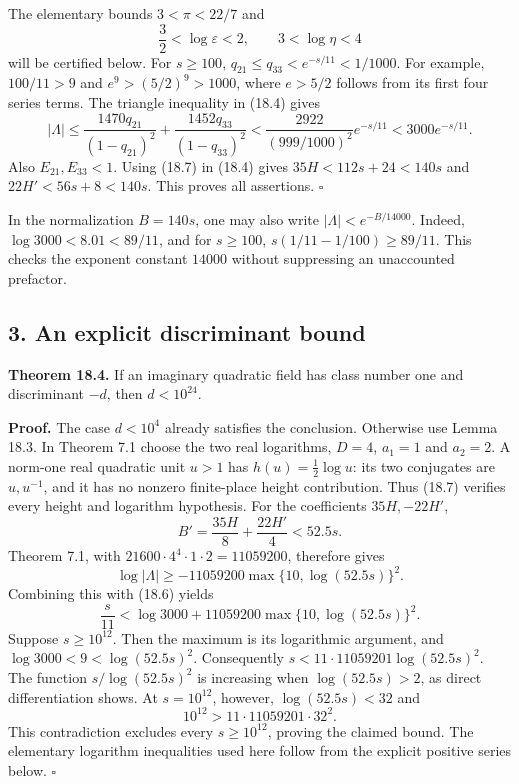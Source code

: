 \documentclass[
  11pt,
  a4paper,
]{article}
\begin{document}
The elementary bounds \(3<\pi<22/7\) and \[
 \frac32<\log\varepsilon<2,\qquad3<\log\eta<4
 \tag{18.7}
\] will be certified below. For \(s\ge100\),
\(q_{21}\le q_{33}<e^{-s/11}<1/1000\). For example, \(100/11>9\) and
\(e^9>(5/2)^9>1000\), where \(e>5/2\) follows from its first four series
terms. The triangle inequality in (18.4) gives \[
 |\Lambda|\le
 \frac{1470q_{21}}{(1-q_{21})^2}
 +\frac{1452q_{33}}{(1-q_{33})^2}
 <\frac{2922}{(999/1000)^2}e^{-s/11}
 <3000e^{-s/11}.
\] Also \(E_{21},E_{33}<1\). Using (18.7) in (18.4) gives
\(35H<112s+24<140s\) and \(22H'<56s+8<140s\). This proves all
assertions. \(\square\)

In the normalization \(B=140s\), one may also write
\(|\Lambda|<e^{-B/14000}\). Indeed, \(\log3000<8.01<89/11\), and for
\(s\ge100\), \(s(1/11-1/100)\ge89/11\). This checks the exponent
constant \(14000\) without suppressing an unaccounted prefactor.

\subsection{3. An explicit discriminant
bound}\label{an-explicit-discriminant-bound}

\textbf{Theorem 18.4.} If an imaginary quadratic field has class number
one and discriminant \(-d\), then \(d<10^{24}\).

\textbf{Proof.} The case \(d<10^4\) already satisfies the conclusion.
Otherwise use Lemma 18.3. In Theorem 7.1 choose the two real logarithms,
\(D=4\), \(a_1=1\) and \(a_2=2\). A norm-one real quadratic unit \(u>1\)
has \(h(u)=\tfrac12\log u\): its two conjugates are \(u,u^{-1}\), and it
has no nonzero finite-place height contribution. Thus (18.7) verifies
every height and logarithm hypothesis. For the coefficients
\(35H,-22H'\), \[
 B'=\frac{35H}{8}+\frac{22H'}4<52.5s.
 \tag{18.8}
\] Theorem 7.1, with \(21600\cdot4^4\cdot1\cdot2=11059200\), therefore
gives \[
 \log|\Lambda|\ge
 -11059200\max\{10,\log(52.5s)\}^2.
 \tag{18.9}
\] Combining this with (18.6) yields \[
 \frac{s}{11}<\log3000+
 11059200\max\{10,\log(52.5s)\}^2.
 \tag{18.10}
\] Suppose \(s\ge10^{12}\). Then the maximum is its logarithmic
argument, and \(\log3000<9<\log(52.5s)^2\). Consequently
\(s<11\cdot11059201\log(52.5s)^2\). The function \(s/\log(52.5s)^2\) is
increasing when \(\log(52.5s)>2\), as direct differentiation shows. At
\(s=10^{12}\), however, \(\log(52.5s)<32\) and \[
 10^{12}>11\cdot11059201\cdot32^2.
 \tag{18.11}
\] This contradiction excludes every \(s\ge10^{12}\), proving the
claimed bound. The elementary logarithm inequalities used here follow
from the explicit positive series below. \(\square\)
\end{document}
